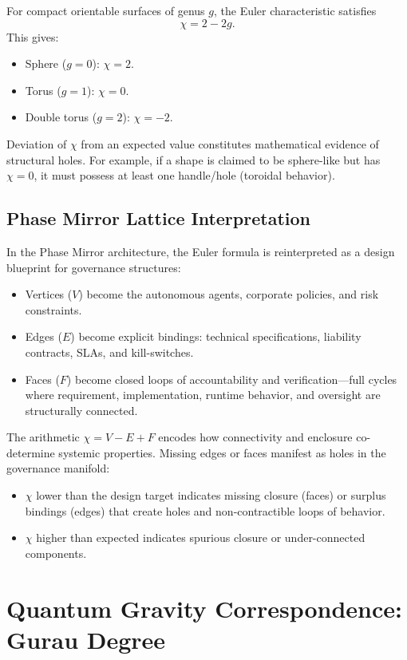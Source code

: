 \documentclass[11pt]{article}
\begin{document}
For compact orientable surfaces of genus \(g\), the Euler characteristic satisfies
\[
\chi = 2 - 2g.
\]
This gives:
\begin{itemize}
  \item Sphere (\(g = 0\)): \(\chi = 2\).
  \item Torus (\(g = 1\)): \(\chi = 0\).
  \item Double torus (\(g = 2\)): \(\chi = -2\).
\end{itemize}

Deviation of \(\chi\) from an expected value constitutes mathematical evidence of structural holes. For example, if a shape is claimed to be sphere-like but has \(\chi = 0\), it must possess at least one handle/hole (toroidal behavior).

\subsection{Phase Mirror Lattice Interpretation}

In the Phase Mirror architecture, the Euler formula is reinterpreted as a design blueprint for governance structures:
\begin{itemize}
  \item Vertices (\(V\)) become the autonomous agents, corporate policies, and risk constraints.
  \item Edges (\(E\)) become explicit bindings: technical specifications, liability contracts, SLAs, and kill-switches.
  \item Faces (\(F\)) become closed loops of accountability and verification---full cycles where requirement, implementation, runtime behavior, and oversight are structurally connected.
\end{itemize}

The arithmetic \(\chi = V - E + F\) encodes how connectivity and enclosure co-determine systemic properties. Missing edges or faces manifest as holes in the governance manifold:
\begin{itemize}
  \item \(\chi\) lower than the design target indicates missing closure (faces) or surplus bindings (edges) that create holes and non-contractible loops of behavior.
  \item \(\chi\) higher than expected indicates spurious closure or under-connected components.
\end{itemize}

\section{Quantum Gravity Correspondence: Gurau Degree}
\end{document}
